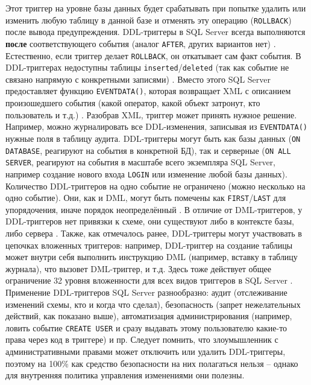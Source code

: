 Этот триггер на уровне базы данных будет срабатывать при попытке удалить или изменить любую таблицу в данной базе и отменять эту операцию (\texttt{ROLLBACK}) после вывода
предупреждения. DDL-триггеры в SQL Server всегда выполняются \textbf{после} соответствующего события (аналог \texttt{AFTER}, других вариантов нет)  \autocite{MicrosoftLearnDDLTrig}. Естественно, если триггер делает \texttt{ROLLBACK}, он откатывает сам факт события. В DDL-триггерах недоступны таблицы \texttt{inserted}/\texttt{deleted} (так как событие не связано напрямую с конкретными записями) \autocite{MicrosoftLearnDDLTrig}. Вместо этого SQL Server предоставляет функцию \texttt{EVENTDATA()}, которая возвращает XML с описанием произошедшего события (какой оператор, какой объект затронут, кто пользователь и т.д.) \autocite{MicrosoftLearnDDLTrig}. Разобрав XML, триггер может принять нужное решение. 
Например, можно журналировать все DDL-изменения, записывая из \texttt{EVENTDATA()} нужные поля в таблицу аудита. DDL-триггеры могут быть как базы данных (\texttt{ON DATABASE}, реагируют на события в конкретной БД), так и серверные (\texttt{ON ALL SERVER}, реагируют на события в масштабе всего экземпляра SQL Server, например создание нового входа \texttt{LOGIN} или изменение любой базы данных).
Количество DDL-триггеров на одно событие не ограничено (можно несколько на одно событие). Они, как и DML, могут быть помечены как \texttt{FIRST}/\texttt{LAST} для упорядочения, иначе порядок неопределённый \autocite{MicrosoftLearnDDLTrig}. В отличие от DML-триггеров, у DDL-триггеров нет привязки к схеме, они существуют либо в контексте базы, либо сервера \autocite{MicrosoftLearnDDLTrig}. 
Также, как отмечалось ранее, DDL-триггеры могут участвовать в цепочках вложенных триггеров: например, DDL-триггер на создание таблицы может внутри себя выполнить инструкцию DML (например, вставку в таблицу журнала), что вызовет DML-триггер, и т.д. Здесь тоже действует общее ограничение 32 уровня вложенности для всех видов триггеров в SQL Server \autocite{MicrosoftLearnNestTrig}.
Применение DDL-триггеров SQL Server разнообразно: аудит (отслеживание изменений схемы, кто и когда что сделал), безопасность (запрет нежелательных действий, как показано выше), автоматизация администрирования (например, ловить событие \texttt{CREATE USER} и сразу выдавать этому пользователю какие-то права через код в триггере) и пр. Следует помнить, что злоумышленник с административными правами может отключить или удалить DDL-триггеры, поэтому на 100\% как средство безопасности на них полагаться нельзя – однако для внутренняя политика управления изменениями они полезны.

